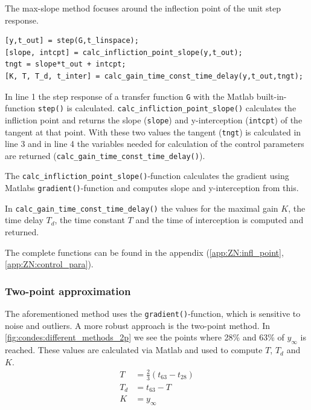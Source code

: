 The max-slope method focuses around the inflection point of the unit step response.

\begin{lstlisting}[style=Matlab-editor,caption={This code snippet show the general way of calculating the control parameters with the max-slope method.},captionpos=b,label={list:condes:maxS}]
[y,t_out] = step(G,t_linspace);
[slope, intcpt] = calc_infliction_point_slope(y,t_out);
tngt = slope*t_out + intcpt;
[K, T, T_d, t_inter] = calc_gain_time_const_time_delay(y,t_out,tngt);
\end{lstlisting}

In line 1 the step response of a transfer function \texttt{G} with the Matlab built-in-function \texttt{step()} is calculated.
\texttt{calc\_infliction\_point\_slope()} calculates the infliction point and returns the slope (\texttt{slope}) and y-interception (\texttt{intcpt}) of the tangent at that point.
With these two values the tangent (\texttt{tngt}) is calculated in line 3 and in line 4 the variables needed for calculation of the control parameters are returned (\texttt{calc\_gain\_time\_const\_time\_delay()}).

The \texttt{calc\_infliction\_point\_slope()}-function calculates the gradient using Matlabs \texttt{gradient()}-function and computes slope and y-interception from this.

In \texttt{calc\_gain\_time\_const\_time\_delay()} the values for the maximal gain $K$, the time delay $T_d$, the time constant $T$ and the time of interception is computed and returned.

The complete functions can be found in the appendix (\autoref{app:ZN:infl_point}, \autoref{app:ZN:control_para}).

\subsubsection{Two-point approximation} \label{sec:condes:ZN:2p}

The aforementioned method uses the \texttt{gradient()}-function, which is sensitive to noise and outliers.
A more robust approach is the two-point method.
In \autoref{fig:condes:different_methods_2p} we see the points where 28\% and 63\% of $y_{\infty}$ is reached.
These values are calculated via Matlab and used to compute $T$, $T_d$ and $K$.
\begin{align}
    T &= \frac{2}{3} \left( t_{63} - t_{28} \right) \\
    T_d &= t_{63} - T \\
    K &= y_{\infty}
\end{align}

